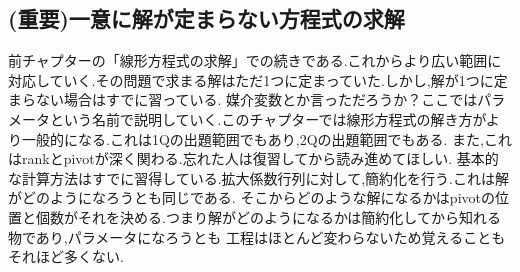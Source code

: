 \subsection{(重要)一意に解が定まらない方程式の求解}
前チャプターの「線形方程式の求解」での続きである.これからより広い範囲に対応していく.その問題で求まる解はただ1つに定まっていた.しかし,解が1つに定まらない場合はすでに習っている.
媒介変数とか言っただろうか？ここではパラメータという名前で説明していく.このチャプターでは線形方程式の解き方がより一般的になる.これは1Qの出題範囲でもあり,2Qの出題範囲でもある.
また,これはrankとpivotが深く関わる.忘れた人は復習してから読み進めてほしい.
基本的な計算方法はすでに習得している.拡大係数行列に対して,簡約化を行う.これは解がどのようになろうとも同じである.
そこからどのような解になるかはpivotの位置と個数がそれを決める.つまり解がどのようになるかは簡約化してから知れる物であり,パラメータになろうとも
工程はほとんど変わらないため覚えることもそれほど多くない.


